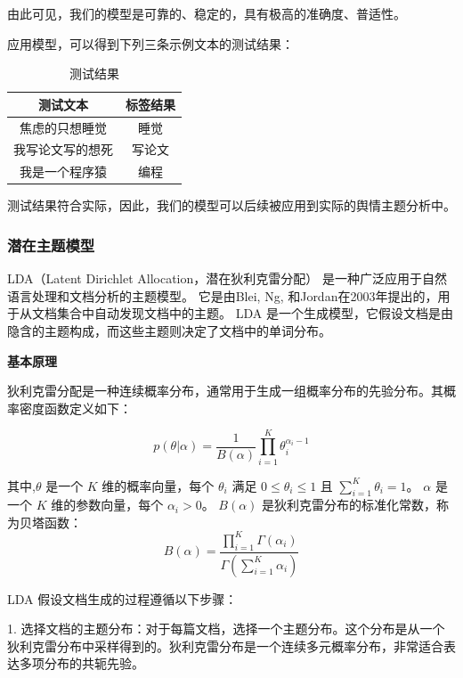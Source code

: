 \documentclass[UTF8,a4paper,15pt,titlepage,oneside]{ctexbook}
\begin{document}
由此可见，我们的模型是可靠的、稳定的，具有极高的准确度、普适性。

应用模型，可以得到下列三条示例文本的测试结果：

\begin{table}[H]
  \centering
  \begin{tabular}{cc}
  \toprule
  测试文本&标签结果\\
  \midrule
  焦虑的只想睡觉 & 睡觉\\
  我写论文写的想死 & 写论文\\
  我是一个程序猿 &编程\\

  \bottomrule
  \end{tabular}
  \caption{测试结果}
  \end{table}


  测试结果符合实际，因此，我们的模型可以后续被应用到实际的舆情主题分析中。

\subsubsection{潜在主题模型}

LDA（Latent Dirichlet Allocation，潜在狄利克雷分配）
是一种广泛应用于自然语言处理和文档分析的主题模型。
它是由Blei, Ng, 和Jordan在2003年提出的，用于从文档集合中自动发现文档中的主题。
LDA 是一个生成模型，它假设文档是由隐含的主题构成，而这些主题则决定了文档中的单词分布。

\vskip 0.2cm
\noindent
\textbf{基本原理}

狄利克雷分配是一种连续概率分布，通常用于生成一组概率分布的先验分布。其概率密度函数定义如下：

\begin{equation}
p(\theta | \alpha) = \frac{1}{B(\alpha)} \prod_{i=1}^K \theta_i^{\alpha_i - 1}
\end{equation}

其中,\(\theta\) 是一个 \(K\) 维的概率向量，每个 \(\theta_i\) 满足 \(0 \leq \theta_i \leq 1\) 且 \(\sum_{i=1}^K \theta_i = 1\)。
\(\alpha\) 是一个 \(K\) 维的参数向量，每个 \(\alpha_i > 0\)。
\(B(\alpha)\) 是狄利克雷分布的标准化常数，称为贝塔函数：
\begin{equation}
    B(\alpha) = \frac{\prod_{i=1}^K \Gamma(\alpha_i)}{\Gamma\left(\sum_{i=1}^K \alpha_i\right)}
  \end{equation}

LDA 假设文档生成的过程遵循以下步骤：

1. 选择文档的主题分布：对于每篇文档，选择一个主题分布。这个分布是从一个狄利克雷分布中采样得到的。狄利克雷分布是一个连续多元概率分布，非常适合表达多项分布的共轭先验。
\end{document}
